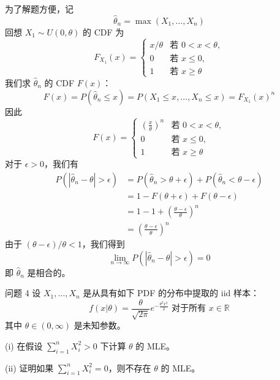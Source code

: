 \begin{questions}
\begin{solution}
为了解题方便，记
\[
\hat{\theta}_n = \max(X_1, \dots, X_n)
\]
回想 $X_1 \sim U(0, \theta)$ 的 CDF 为
\[
F_{X_1}(x) = \begin{cases} x/\theta & \text{若 } 0 < x < \theta, \\ 0 & \text{若 } x \le 0, \\ 1 & \text{若 } x \ge \theta \end{cases}
\]
我们求 $\hat{\theta}_n$ 的 CDF $F(x)$：
\[
F(x) = P(\hat{\theta}_n \le x) = P(X_1 \le x, \dots, X_n \le x) = F_{X_1}(x)^n
\]
因此
\[
F(x) = \begin{cases} \left(\frac{x}{\theta}\right)^n & \text{若 } 0 < x < \theta, \\ 0 & \text{若 } x \le 0, \\ 1 & \text{若 } x \ge \theta \end{cases}
\]
对于 $\epsilon > 0$，我们有
\begin{align*}
P(|\hat{\theta}_n - \theta| > \epsilon) &= P(\hat{\theta}_n > \theta + \epsilon) + P(\hat{\theta}_n < \theta - \epsilon) \\
&= 1 - F(\theta + \epsilon) + F(\theta - \epsilon) \\
&= 1 - 1 + \left(\frac{\theta - \epsilon}{\theta}\right)^n \\
&= \left(\frac{\theta - \epsilon}{\theta}\right)^n
\end{align*}
由于 $(\theta - \epsilon)/\theta < 1$，我们得到
\[
\lim_{n \to \infty} P(|\hat{\theta}_n - \theta| > \epsilon) = 0
\]
即 $\hat{\theta}_n$ 是相合的。
\end{solution}

\question 问题 4 设 $X_1, \dots, X_n$ 是从具有如下 PDF 的分布中提取的 iid 样本：
\[
f(x|\theta) = \frac{\theta}{\sqrt{2\pi}} e^{-\frac{\theta^2 x^2}{2}} \text{ 对于所有 } x \in \mathbb{R}
\]
其中 $\theta \in (0, \infty)$ 是未知参数。

(i) 在假设 $\sum_{i=1}^n X_i^2 > 0$ 下计算 $\theta$ 的 MLE。

(ii) 证明如果 $\sum_{i=1}^n X_i^2 = 0$，则不存在 $\theta$ 的 MLE。


\end{questions}

